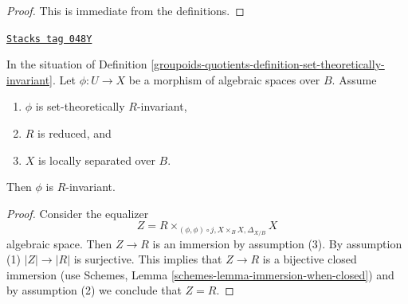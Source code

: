 \begin{proof}
This is immediate from the definitions.
\end{proof}

\begin{lemma}
\label{groupoids-quotients-lemma-set-theoretically-invariant-invariant-when-reduced}
\href{https://stacks.math.columbia.edu/tag/048Y}{\texttt{Stacks tag 048Y}}

In the situation of Definition \ref{groupoids-quotients-definition-set-theoretically-invariant}.
Let $\phi : U \to X$ be a morphism of algebraic spaces over $B$.
Assume
\begin{enumerate}
\item $\phi$ is set-theoretically $R$-invariant,
\item $R$ is reduced, and
\item $X$ is locally separated over $B$.
\end{enumerate}
Then $\phi$ is $R$-invariant.
\end{lemma}

\begin{proof}
Consider the equalizer
$$
Z = R \times_{(\phi, \phi) \circ j, X \times_B X, \Delta_{X/B}} X
$$
algebraic space. Then $Z \to R$ is an immersion by assumption (3).
By assumption (1) $|Z| \to |R|$ is surjective. This implies that
$Z \to R$ is a bijective closed immersion (use
Schemes, Lemma \ref{schemes-lemma-immersion-when-closed})
and by assumption (2) we conclude that $Z = R$.
\end{proof}

